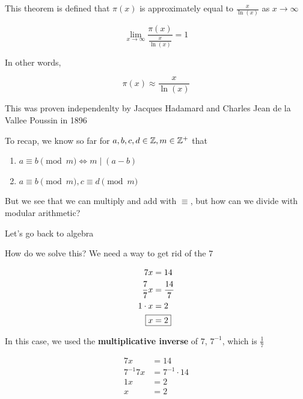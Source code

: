 \documentclass[../../Main.tex]{subfiles}
\begin{document}
\begin{theorem}
    
    This theorem is defined that $\pi(x)$ is approximately equal to $\frac{x}{\ln(x)}$ as $x \rightarrow \infty$

    $$\lim_{x \rightarrow \infty} \frac{\pi(x)}{\frac{x}{\ln(x)}} = 1$$

    In other words,

    $$\pi(x) \approx \frac{x}{\ln(x)}$$

    \begin{note}
        This was proven independenlty by Jacques Hadamard and Charles Jean de la Vallee Poussin in 1896
    \end{note}
\end{theorem}

To recap, we know so far for $a, b, c, d \in \mathbb{Z}, m \in \mathbb{Z}^+$ that

\begin{enumerate}
    \item $a \equiv b \pmod{m} \iff m \mid (a-b)$
    \item
    {
        $a \equiv b \pmod{m}, c \equiv d \pmod{m}$

    }
\end{enumerate}

But we see that we can multiply and add with $\equiv$, but how can we divide with modular arithmetic?

Let's go back to algebra

How do we solve this? We need a way to get rid of the $7$

\begin{align*}
    7x &= 14 \\
    \frac{7}{7}x &= \frac{14}{7} \\
    1 \cdot x &= 2 \\
    \Aboxed{x &= 2} \\
\end{align*}

In this case, we used the \textbf{multiplicative inverse} of $7$, $7^{-1}$, which is $\frac{1}{7}$

\begin{align*}
    7x &= 14 \\
    7^{-1} 7x &= 7^{-1} \cdot 14 \tag{Multiplicative Inverse} \\
    1x &= 2 \tag{Multiplicative Identity} \\
    x &= 2
\end{align*}
\end{document}
